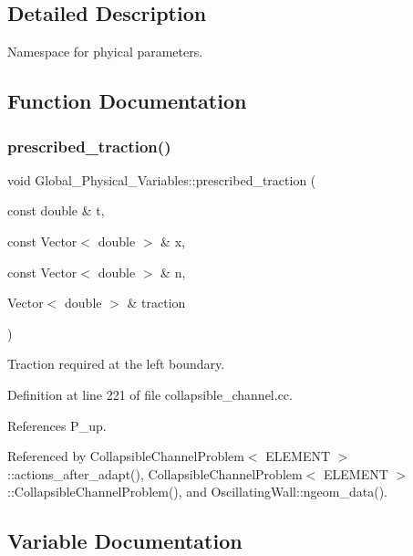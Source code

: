 \subsection{Detailed Description}
Namespace for phyical parameters. 

\subsection{Function Documentation}
\mbox{\label{namespaceGlobal__Physical__Variables_a0de42ee6d39e85c77c16a04c3a05f7a2}} 
\subsubsection{\texorpdfstring{prescribed\+\_\+traction()}{prescribed\_traction()}}
{\footnotesize\ttfamily void Global\+\_\+\+Physical\+\_\+\+Variables\+::prescribed\+\_\+traction (\begin{DoxyParamCaption}\item[{const double \&}]{t,  }\item[{const Vector$<$ double $>$ \&}]{x,  }\item[{const Vector$<$ double $>$ \&}]{n,  }\item[{Vector$<$ double $>$ \&}]{traction }\end{DoxyParamCaption})}



Traction required at the left boundary. 



Definition at line 221 of file collapsible\+\_\+channel.\+cc.



References P\+\_\+up.



Referenced by Collapsible\+Channel\+Problem$<$ E\+L\+E\+M\+E\+N\+T $>$\+::actions\+\_\+after\+\_\+adapt(), Collapsible\+Channel\+Problem$<$ E\+L\+E\+M\+E\+N\+T $>$\+::\+Collapsible\+Channel\+Problem(), and Oscillating\+Wall\+::ngeom\+\_\+data().



\subsection{Variable Documentation}
\mbox{\label{namespaceGlobal__Physical__Variables_ae1a493695b7f4619af32f405b0b28861}} 
